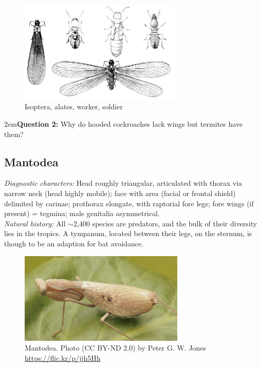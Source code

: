 \documentclass[letterpaper, 11pt]{article}
\begin{document}
\begin{figure}[ht!]
  \centering
    \includegraphics[width=0.7\textwidth]{Isoptera}
  \caption{Isoptera, alates, worker, soldier \citep[][Plate II]{bhl82061}}
  \label{fig:termite}
\end{figure}

\hangindent2em\textbf{Question 2:} Why do hooded cockroaches lack wings but termites have them?\\

\subsection{Mantodea}
\noindent{}\textit{Diagnostic characters:} Head roughly triangular, articulated with thorax via narrow neck (head highly mobile); face with area (facial or frontal shield) delimited by carinae; prothorax elongate, with raptorial fore legs; fore wings (if present) = tegmina; male genitalia asymmetrical.\\

\noindent{}\textit{Natural history:} All $\sim$2,400 species are predators, and the bulk of their diversity lies in the tropics. A tympanum, located between their legs, on the sternum, is though to be an adaption for bat avoidance.\\

\begin{figure}[ht!]
  \centering
    \includegraphics[width=0.7\textwidth]{mantid1}
  \caption{Mantodea. Photo (CC BY-ND 2.0) by Peter G. W. Jones \url{https://flic.kr/p/jjh5Hh}}
  \label{fig:mantidbody}
\end{figure}
\end{document}
